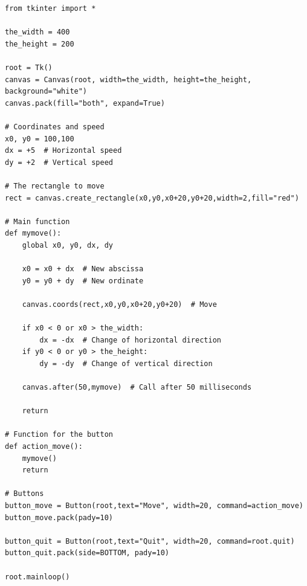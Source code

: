 \documentclass[11pt,class=report,crop=false]{standalone}
\begin{document}
\begin{lstlisting}
from tkinter import *

the_width = 400
the_height = 200

root = Tk()     
canvas = Canvas(root, width=the_width, height=the_height, background="white")
canvas.pack(fill="both", expand=True)

# Coordinates and speed
x0, y0 = 100,100
dx = +5  # Horizontal speed
dy = +2  # Vertical speed

# The rectangle to move
rect = canvas.create_rectangle(x0,y0,x0+20,y0+20,width=2,fill="red")

# Main function
def mymove():
    global x0, y0, dx, dy

    x0 = x0 + dx  # New abscissa
    y0 = y0 + dy  # New ordinate

    canvas.coords(rect,x0,y0,x0+20,y0+20)  # Move

    if x0 < 0 or x0 > the_width:
        dx = -dx  # Change of horizontal direction
    if y0 < 0 or y0 > the_height:
        dy = -dy  # Change of vertical direction

    canvas.after(50,mymove)  # Call after 50 milliseconds
 
    return
    
# Function for the button
def action_move():
    mymove()
    return

# Buttons
button_move = Button(root,text="Move", width=20, command=action_move)
button_move.pack(pady=10)

button_quit = Button(root,text="Quit", width=20, command=root.quit)
button_quit.pack(side=BOTTOM, pady=10)

root.mainloop()
\end{lstlisting}
\end{document}
